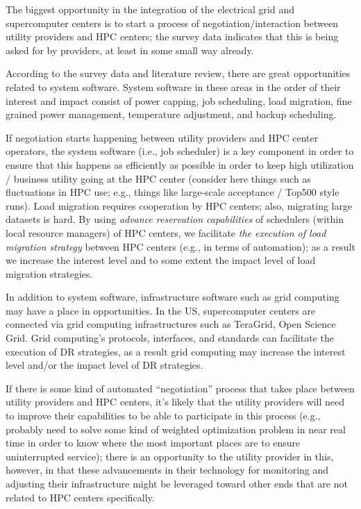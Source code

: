 The biggest opportunity in the integration of the electrical grid and supercomputer centers is to start a process of negotiation/interaction between utility providers and HPC centers; the survey data indicates that this is being asked for by providers, at least in some small way already.

According to the survey data and literature review, there are great opportunities related to system software. System software in these areas in the order of their interest and impact consist of power capping, job scheduling, load migration, fine grained power management, temperature adjustment, and backup scheduling.

If negotiation starts happening between utility providers and HPC center operators, the system software (i.e., job scheduler) is a key component in order to ensure that this happens as efficiently as possible in order to keep high utilization / business utility going at the HPC center (consider here things such as fluctuations in HPC use; e.g., things like large-scale acceptance / Top500 style runs). Load migration requires cooperation by HPC centers; also, migrating large datasets is hard. By using \textit{advance reservation capabilities} of schedulers (within local resource managers) of HPC centers, we facilitate \textit{the execution of load migration strategy} between HPC centers (e.g., in terms of automation); as a result we increase the interest level and to some extent the impact level of load migration strategies.

In addition to system software, infrastructure software such as grid computing may have a place in opportunities. In the US, supercomputer centers are connected via grid computing infrastructures such as TeraGrid, Open Science Grid. Grid computing's protocols, interfaces, and standards can facilitate the execution of DR strategies, as a result grid computing may increase the interest level and/or the impact level of DR strategies.

If there is some kind of automated ``negotiation'' process that takes place between utility providers and HPC centers, it's likely that the utility providers will need to improve their capabilities to be able to participate in this process (e.g., probably need to solve some kind of weighted optimization problem in near real time in order to know where the most important places are to ensure uninterrupted service); there is an opportunity to the utility provider in this, however, in that these advancements in their technology for monitoring and adjusting their infrastructure might be leveraged toward other ends that are not related to HPC centers specifically.


